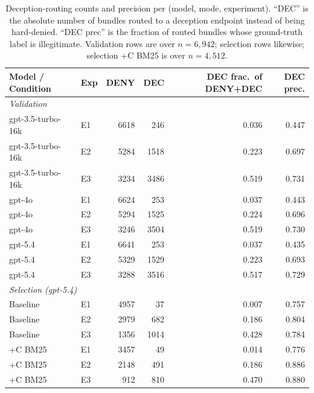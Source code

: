 \documentclass[10pt,a4paper,twocolumn]{article}
\begin{document}
\begin{table}[H]
\centering
\caption{Deception-routing counts and precision per (model, mode, experiment). ``DEC'' is the absolute number of bundles routed to a deception endpoint instead of being hard-denied. ``DEC prec'' is the fraction of routed bundles whose ground-truth label is illegitimate. Validation rows are over $n=6{,}942$; selection rows likewise; selection +C BM25 is over $n=4{,}512$.}
\label{tab:deception_counts}
\scriptsize
\setlength{\tabcolsep}{4pt}
\begin{tabular}{@{}llrrrr@{}}
\toprule
\textbf{Model / Condition} & \textbf{Exp} & \textbf{DENY} & \textbf{DEC} & \textbf{DEC frac.\ of DENY+DEC} & \textbf{DEC prec.} \\
\midrule
\multicolumn{6}{l}{\textit{Validation}} \\
gpt-3.5-turbo-16k & E1 & 6618 &  246 & 0.036 & 0.447 \\
gpt-3.5-turbo-16k & E2 & 5284 & 1518 & 0.223 & 0.697 \\
gpt-3.5-turbo-16k & E3 & 3234 & 3486 & 0.519 & 0.731 \\
gpt-4o            & E1 & 6624 &  253 & 0.037 & 0.443 \\
gpt-4o            & E2 & 5294 & 1525 & 0.224 & 0.696 \\
gpt-4o            & E3 & 3246 & 3504 & 0.519 & 0.730 \\
gpt-5.4           & E1 & 6641 &  253 & 0.037 & 0.435 \\
gpt-5.4           & E2 & 5329 & 1529 & 0.223 & 0.693 \\
gpt-5.4           & E3 & 3288 & 3516 & 0.517 & 0.729 \\
\midrule
\multicolumn{6}{l}{\textit{Selection (gpt-5.4)}} \\
Baseline & E1 & 4957 &   37 & 0.007 & 0.757 \\
Baseline & E2 & 2979 &  682 & 0.186 & 0.804 \\
Baseline & E3 & 1356 & 1014 & 0.428 & 0.784 \\
+C BM25  & E1 & 3457 &   49 & 0.014 & 0.776 \\
+C BM25  & E2 & 2148 &  491 & 0.186 & 0.886 \\
+C BM25  & E3 &  912 &  810 & 0.470 & 0.880 \\
\bottomrule
\end{tabular}
\end{table}
\end{document}
